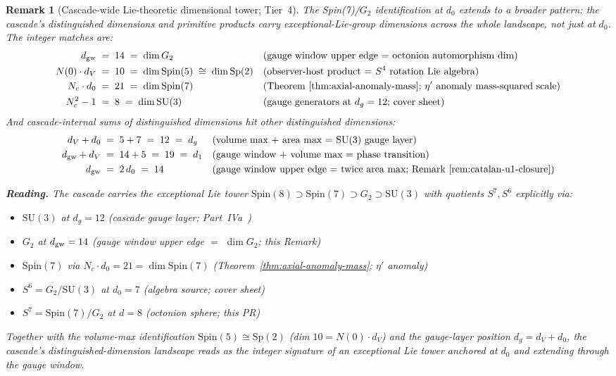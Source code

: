 \documentclass[12pt,a4paper]{article}
\newtheorem*{remark}{Remark}
\begin{document}
\begin{remark}[Cascade-wide Lie-theoretic dimensional tower; Tier~4]\label{rem:lie-theoretic-tower}
The Spin(7)/$G_2$ identification at $d_0$ extends to a broader pattern: the cascade's distinguished dimensions and primitive products carry exceptional-Lie-group dimensions across the whole landscape, not just at $d_0$. The integer matches are:
\begin{align*}
d_{\rm gw} &\;=\; 14 \;=\; \dim G_2
&&\text{(gauge window upper edge $=$ octonion automorphism dim)}\\
N(0)\cdot d_V &\;=\; 10 \;=\; \dim\mathrm{Spin}(5) \;\cong\; \dim\mathrm{Sp}(2)
&&\text{(observer-host product $=$ $S^4$ rotation Lie algebra)}\\
N_c\cdot d_0 &\;=\; 21 \;=\; \dim\mathrm{Spin}(7)
&&\text{(Theorem~\ref{thm:axial-anomaly-mass}; $\eta'$ anomaly mass-squared scale)}\\
N_c^2 - 1 &\;=\; 8 \;=\; \dim\mathrm{SU}(3)
&&\text{(gauge generators at $d_g=12$; cover sheet)}
\end{align*}
And cascade-internal sums of distinguished dimensions hit other distinguished dimensions:
\begin{align*}
d_V + d_0 &\;=\; 5 + 7 \;=\; 12 \;=\; d_g
&&\text{(volume max $+$ area max $=$ SU(3) gauge layer)}\\
d_{\rm gw} + d_V &\;=\; 14 + 5 \;=\; 19 \;=\; d_1
&&\text{(gauge window $+$ volume max $=$ phase transition)}\\
d_{\rm gw} &\;=\; 2\,d_0 \;=\; 14
&&\text{(gauge window upper edge $=$ twice area max; Remark~\ref{rem:catalan-u1-closure})}
\end{align*}

\medskip\noindent\textbf{Reading.} The cascade carries the exceptional Lie tower $\mathrm{Spin}(8)\supset\mathrm{Spin}(7)\supset G_2 \supset \mathrm{SU}(3)$ with quotients $S^7, S^6$ explicitly via:
\begin{itemize}[nosep]
\item $\mathrm{SU}(3)$ at $d_g=12$ (cascade gauge layer; Part~IVa~\cite{part4a})
\item $G_2$ at $d_{\rm gw}=14$ (gauge window upper edge $=$ $\dim G_2$; this Remark)
\item $\mathrm{Spin}(7)$ via $N_c\cdot d_0 = 21 = \dim\mathrm{Spin}(7)$ (Theorem~\ref{thm:axial-anomaly-mass}; $\eta'$ anomaly)
\item $S^6 = G_2/\mathrm{SU}(3)$ at $d_0=7$ (algebra source; cover sheet)
\item $S^7 = \mathrm{Spin}(7)/G_2$ at $d=8$ (octonion sphere; this PR)
\end{itemize}
Together with the volume-max identification $\mathrm{Spin}(5)\cong\mathrm{Sp}(2)$ (dim $10 = N(0)\cdot d_V$) and the gauge-layer position $d_g = d_V + d_0$, the cascade's distinguished-dimension landscape reads as the integer signature of an exceptional Lie tower anchored at $d_0$ and extending through the gauge window.


\end{remark}
\end{document}
